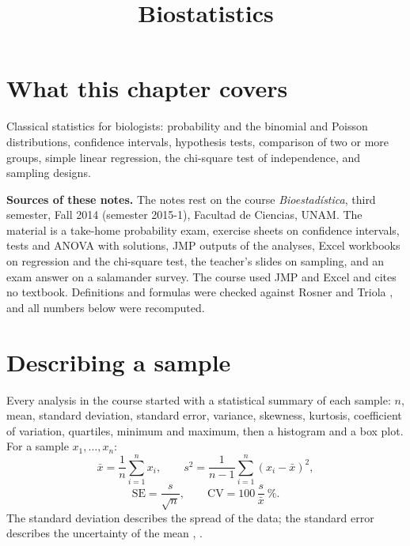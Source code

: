 



\title{Biostatistics}
\maketitle

\label{section-phantom}

\tableofcontents

\section{What this chapter covers}
\label{section-overview}

Classical statistics for biologists:
probability and the binomial and Poisson
distributions, confidence intervals,
hypothesis tests, comparison of two or
more groups, simple linear regression,
the chi-square test of independence, and
sampling designs.

\textbf{Sources of these notes.}
The notes rest on the course
\emph{Bioestad\'istica}, third semester,
Fall 2014 (semester 2015-1), Facultad de
Ciencias, UNAM. The material is
a take-home probability exam,
exercise sheets on confidence intervals,
tests and ANOVA with solutions, JMP
outputs of the analyses, Excel workbooks
on regression and the chi-square test,
the teacher's slides on sampling, and an
exam answer on a salamander survey. The
course used JMP and Excel and cites no
textbook. Definitions and formulas were
checked against Rosner
\cite{rosner2011biostatistics} and Triola
\cite{triola2012elementary}, and all
numbers below were recomputed.

\section{Describing a sample}
\label{section-descriptive}

Every analysis in the course started
with a statistical summary of each
sample: $n$, mean, standard deviation,
standard error, variance, skewness,
kurtosis, coefficient of variation,
quartiles, minimum and maximum, then a
histogram and a box plot. For a sample
$x_1, \dots, x_n$:
$$
\bar{x} = \frac{1}{n}\sum_{i=1}^n x_i,
\qquad
s^2 = \frac{1}{n-1}
\sum_{i=1}^n (x_i - \bar{x})^2,
$$
$$
\mathrm{SE} = \frac{s}{\sqrt{n}},
\qquad
\mathrm{CV} = 100\,\frac{s}{\bar{x}}\ \%.
$$
The standard deviation describes the
spread of the data; the standard error
describes the uncertainty of the mean
\cite[Section 2.6]{rosner2011biostatistics},
\cite[Section
6.5]{rosner2011biostatistics}.

